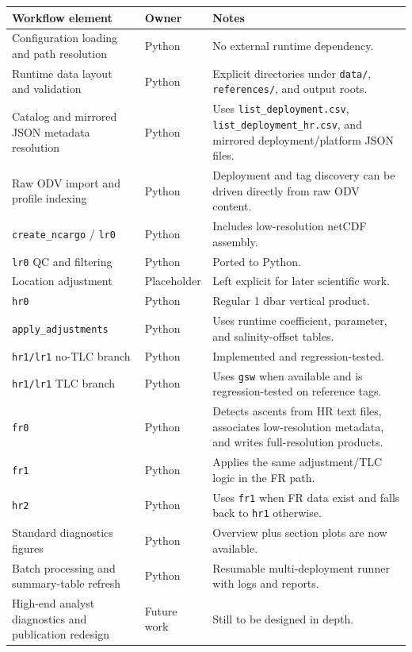 \documentclass[11pt,a4paper]{article}
\newcommand{\pkg}[1]{\texttt{#1}}
\begin{document}
\begin{longtable}{>{\raggedright\arraybackslash}p{} >{\raggedright\arraybackslash}p{} >{\raggedright\arraybackslash}p{}}
\toprule
\textbf{Workflow element} & \textbf{Owner} & \textbf{Notes} \\
\midrule
\endhead
Configuration loading and path resolution & Python & No external runtime dependency. \\
Runtime data layout and validation & Python & Explicit directories under \pkg{data/}, \pkg{references/}, and output roots. \\
Catalog and mirrored JSON metadata resolution & Python & Uses \pkg{list\_deployment.csv}, \pkg{list\_deployment\_hr.csv}, and mirrored deployment/platform JSON files. \\
Raw ODV import and profile indexing & Python & Deployment and tag discovery can be driven directly from raw ODV content. \\
\pkg{create\_ncargo} / \pkg{lr0} & Python & Includes low-resolution netCDF assembly. \\
\pkg{lr0} QC and filtering & Python & Ported to Python. \\
Location adjustment & Placeholder & Left explicit for later scientific work. \\
\pkg{hr0} & Python & Regular 1 dbar vertical product. \\
\pkg{apply\_adjustments} & Python & Uses runtime coefficient, parameter, and salinity-offset tables. \\
\pkg{hr1/lr1} no-TLC branch & Python & Implemented and regression-tested. \\
\pkg{hr1/lr1} TLC branch & Python & Uses \pkg{gsw} when available and is regression-tested on reference tags. \\
\pkg{fr0} & Python & Detects ascents from HR text files, associates low-resolution metadata, and writes full-resolution products. \\
\pkg{fr1} & Python & Applies the same adjustment/TLC logic in the FR path. \\
\pkg{hr2} & Python & Uses \pkg{fr1} when FR data exist and falls back to \pkg{hr1} otherwise. \\
Standard diagnostics figures & Python & Overview plus section plots are now available. \\
Batch processing and summary-table refresh & Python & Resumable multi-deployment runner with logs and reports. \\
High-end analyst diagnostics and publication redesign & Future work & Still to be designed in depth. \\
\bottomrule
\end{longtable}
\end{document}
